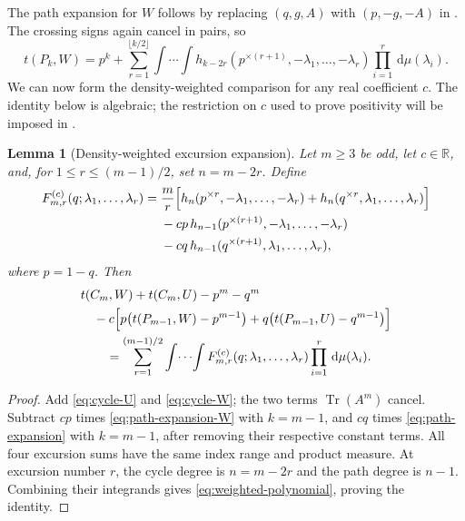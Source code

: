 \documentclass[11pt]{article}
\newtheorem{lemma}[theorem]{Lemma}
\numberwithin{equation}{section}
\newcommand{\R}{\mathbb R}
\newcommand{\Tr}{\operatorname{Tr}}
\newcommand{\dd}{\,\mathrm d}
\newcommand{\tC}[2]{t(C_{#1},#2)}
\newcommand{\tP}[2]{t(P_{#1},#2)}
\newcommand{\rep}[2]{#1^{\times #2}}
\begin{document}
The path expansion for $W$ follows by replacing $(q,g,A)$ with
$(p,-g,-A)$ in . The crossing signs again
cancel in pairs, so
\begin{equation}\label{eq:path-expansion-W}
  \tP kW=p^k+
  \sum_{r=1}^{\lfloor k/2\rfloor}
    \int\!\cdots\!\int
    h_{k-2r}(\rep p{(r+1)},-\lambda_1,\ldots,-\lambda_r)
    \prod_{i=1}^r\dd\mu(\lambda_i).
\end{equation}
We can now form the density-weighted comparison for any real
coefficient $c$. The identity below is algebraic; the restriction on
$c$ used to prove positivity will be imposed in
.

\begin{lemma}[Density-weighted excursion expansion]
\label{lem:weighted-expansion}
  Let $m\ge3$ be odd, let $c\in\R$, and, for
  $1\le r\le(m-1)/2$, set $n=m-2r$. Define
  \begin{align}
    F^{(c)}_{m,r}(q;\lambda_1,\ldots,\lambda_r)
    ={}&\frac mr\Bigl[
      h_n(\rep pr,-\lambda_1,\ldots,-\lambda_r)
      +h_n(\rep qr,\lambda_1,\ldots,\lambda_r)
      \Bigr]\notag\\
    &-cp\,h_{n-1}(\rep p{(r+1)},-\lambda_1,\ldots,-\lambda_r)
      \notag\\
    &-cq\,h_{n-1}(\rep q{(r+1)},\lambda_1,\ldots,\lambda_r),
    \label{eq:weighted-polynomial}
  \end{align}
  where $p=1-q$. Then
  \begin{equation}\label{eq:weighted-expansion}
    \begin{aligned}
      &\tC mW+\tC mU-p^m-q^m\\
      &\quad-c\Bigl[p\bigl(\tP{m-1}W-p^{m-1}\bigr)
               +q\bigl(\tP{m-1}U-q^{m-1}\bigr)\Bigr]\\
      &\qquad=\sum_{r=1}^{(m-1)/2}
        \int\!\cdots\!\int
        F^{(c)}_{m,r}(q;\lambda_1,\ldots,\lambda_r)
        \prod_{i=1}^r\dd\mu(\lambda_i).
    \end{aligned}
  \end{equation}
\end{lemma}

\begin{proof}
  Add \eqref{eq:cycle-U} and \eqref{eq:cycle-W}; the two terms
  $\Tr(A^m)$ cancel. Subtract $cp$ times
  \eqref{eq:path-expansion-W} with $k=m-1$, and $cq$ times
  \eqref{eq:path-expansion} with $k=m-1$, after removing their
  respective constant terms. All four excursion sums have the same
  index range and product measure. At excursion number $r$, the
  cycle degree is $n=m-2r$ and the path degree is $n-1$.
  Combining their integrands gives
  \eqref{eq:weighted-polynomial}, proving the identity.
\end{proof}
\end{document}
